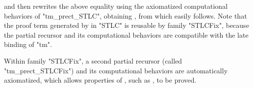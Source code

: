 \noindent
and then rewrites the above equality using the axiomatized computational behaviors
of "tm_prect_STLC",
obtaining ,
from which  easily follows.
%
Note that the proof term generated by  in "STLC"
is reusable by family "STLCFix", because the partial recursor and its
computational behaviors are compatible with the late binding of "tm".

Within family "STLCFix", a second partial recursor
(called "tm_prect_STLCFix") and its computational behaviors are automatically axiomatized,
which allows properties of , such as
, to be proved.



\ifShowOldWriting

\newpage

